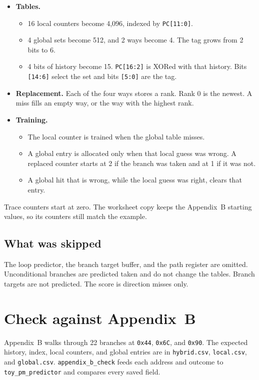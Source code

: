\documentclass[11pt]{article}
\begin{document}
\begin{itemize}
  \item \textbf{Tables.}
  \begin{itemize}
    \item 16 local counters become 4,096, indexed by \texttt{PC[11:0]}.
    \item 4 global sets become 512, and 2 ways become 4. The tag grows from
          2 bits to 6.
    \item 4 bits of history become 15. \texttt{PC[16:2]} is XORed with that
          history. Bits \texttt{[14:6]} select the set and bits
          \texttt{[5:0]} are the tag.
  \end{itemize}
  \item \textbf{Replacement.} Each of the four ways stores a rank. Rank 0 is
        the newest. A miss fills an empty way, or the way with the highest
        rank.
  \item \textbf{Training.}
  \begin{itemize}
    \item The local counter is trained when the global table misses.
    \item A global entry is allocated only when that local guess was wrong.
          A replaced counter starts at 2 if the branch was taken and at 1 if
          it was not.
    \item A global hit that is wrong, while the local guess was right, clears
          that entry.
  \end{itemize}
\end{itemize}

Trace counters start at zero. The worksheet copy keeps the Appendix~B
starting values, so its counters still match the example.

\subsection{What was skipped}

The loop predictor, the branch target buffer, and the path register are
omitted. Unconditional branches are predicted taken and do not change the
tables. Branch targets are not predicted. The score is direction misses only.

\section{Check against Appendix~B}

Appendix~B walks through 22 branches at \texttt{0x44}, \texttt{0x6C}, and
\texttt{0x90}. The expected history, index, local counters, and global
entries are in \texttt{hybrid.csv}, \texttt{local.csv}, and
\texttt{global.csv}. \texttt{appendix\_b\_check} feeds each address and
outcome to \texttt{toy\_pm\_predictor} and compares every saved field.
\end{document}
